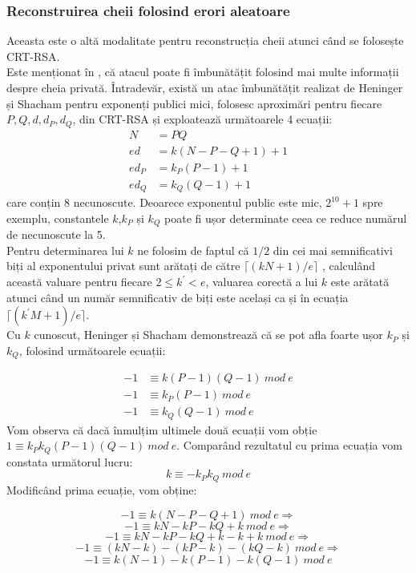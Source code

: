 \documentclass[12]{report}
\begin{document}
\subsubsection{Reconstruirea cheii folosind erori aleatoare}
Aceasta este o altă modalitate pentru reconstrucția cheii atunci când se folosește CRT-RSA.\\
Este menționat în \cite{95}, că atacul poate fi îmbunătățit folosind mai multe informații despre cheia privată. Întradevăr, există un atac îmbunătățit realizat de Heninger și Shacham \cite{heninger} pentru exponenți publici mici, folosesc aproximări pentru fiecare $P,Q,d,d_P,d_Q$, din CRT-RSA și exploatează următoarele 4 ecuații:
\begin{align*}
N&=PQ \\
ed&=k(N-P-Q+1)+1\\
ed_P&=k_P(P-1)+1\\
ed_Q&=k_Q(Q-1)+1 
\end{align*}
care conțin 8 necunoscute. Deoarece exponentul public este mic, $2^{10}+1$ spre exemplu, constantele $k$,$k_P$ și $k_Q$ poate fi ușor determinate ceea ce reduce numărul de necunoscute la 5.\\
Pentru determinarea lui $k$ ne folosim de faptul că $1/2$ din cei mai semnificativi biți al exponentului privat sunt arătați de către $\lceil (kN+1)/e \rceil $ , calculând această valuare pentru fiecare $2 \leqslant k^{'} < e$, valuarea corectă a lui $k$ este arătată atunci când un număr semnificativ de biți este același ca și în ecuația $ \lceil (k^{'}M+1)/e   \rceil$. \\
Cu $k$ cunoscut, Heninger și Shacham demonstrează că se pot afla foarte ușor $k_P$ și $k_Q$, folosind următoarele ecuații: 

\begin{align*}
-1 &\equiv k(P-1)(Q-1) \ mod \ e \\
-1 &\equiv k_P(P-1) \ mod \ e \\
-1 &\equiv k_Q(Q-1) \ mod \ e
\end{align*}
Vom observa că dacă înmulțim ultimele două ecuații vom obție $ 1 \equiv k_Pk_Q(P-1)(Q-1) \ mod \ e$. Comparând rezultatul cu prima ecuația vom constata următorul lucru:
$$ k \equiv -k_Pk_Q \ mod \ e $$
Modificând prima ecuație, vom obține:

$$ -1 \equiv k(N-P-Q+1) \ mod \ e \Rightarrow $$
$$ -1 \equiv kN - kP - kQ +k \ mod \ e \Rightarrow$$
$$ -1 \equiv kN-kP-kQ + k - k + k \ mod \ e \Rightarrow$$
$$ -1 \equiv (kN-k) - (kP - k ) - (kQ - k ) \ mod \ e \Rightarrow$$
$$ -1 \equiv k(N-1) -k(P-1) - k(Q-1) \ mod \ e $$
\end{document}

